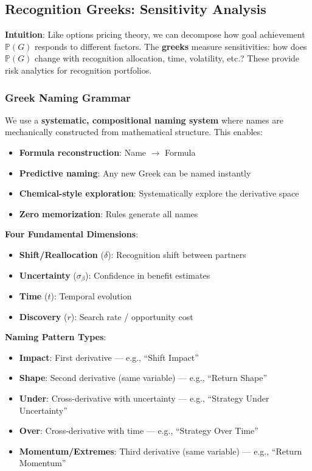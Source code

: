 
\subsection{Recognition Greeks: Sensitivity Analysis}

\textbf{Intuition}: Like options pricing theory, we can decompose how goal achievement $\mathbb{P}(G)$ responds to different factors. The \textbf{greeks} measure sensitivities: how does $\mathbb{P}(G)$ change with recognition allocation, time, volatility, etc.? These provide risk analytics for recognition portfolios.

\subsubsection{Greek Naming Grammar}

We use a \textbf{systematic, compositional naming system} where names are mechanically constructed from mathematical structure. This enables:
\begin{itemize}
\item \textbf{Formula reconstruction}: Name $\rightarrow$ Formula
\item \textbf{Predictive naming}: Any new Greek can be named instantly
\item \textbf{Chemical-style exploration}: Systematically explore the derivative space
\item \textbf{Zero memorization}: Rules generate all names
\end{itemize}

\textbf{Four Fundamental Dimensions}:
\begin{itemize}
\item \textbf{Shift/Reallocation} ($\delta$): Recognition shift between partners
\item \textbf{Uncertainty} ($\sigma_\beta$): Confidence in benefit estimates
\item \textbf{Time} ($t$): Temporal evolution
\item \textbf{Discovery} ($r$): Search rate / opportunity cost
\end{itemize}

\textbf{Naming Pattern Types}:
\begin{itemize}
\item \textbf{Impact}: First derivative --- e.g., ``Shift Impact''
\item \textbf{Shape}: Second derivative (same variable) --- e.g., ``Return Shape''
\item \textbf{Under}: Cross-derivative with uncertainty --- e.g., ``Strategy Under Uncertainty''
\item \textbf{Over}: Cross-derivative with time --- e.g., ``Strategy Over Time''
\item \textbf{Momentum/Extremes}: Third derivative (same variable) --- e.g., ``Return Momentum''
\end{itemize}

